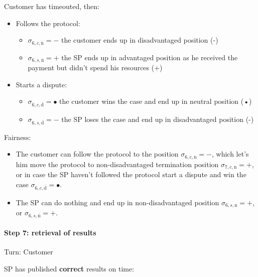 \documentclass{ieeeaccess}
\begin{document}
Customer has timeouted, then:

\begin{itemize}
\item
  Follows the protocol:

  \begin{itemize}
  
  \item
    \(\sigma_{6, c, \overline{\mathrm{n}}} = -\) the customer ends up in
    disadvantaged position (-)
  \item
    \(\sigma_{6, s, \overline{\mathrm{n}}} = +\) the SP ends up in
    advantaged position as he received the payment but didn't spend his
    resources (+)
  \end{itemize}
\item
  Starts a dispute:

  \begin{itemize}
  
  \item
    \(\sigma_{6, c, \overline{\mathrm{d}}} = •\) the customer wins the
    case and end up in neutral position (•)
  \item
    \(\sigma_{6, s, \overline{\mathrm{d}}} = -\) the SP loses the case
    and end up in disadvantaged position (-)
  \end{itemize}
\end{itemize}

Fairness:

\begin{itemize}

\item
  The customer can follow the protocol to the position
  \(\sigma_{6, c, \mathrm{n}} = -\), which let's him move the protocol
  to non-disadvantaged termination position
  \(\sigma_{7, c, \mathrm{n}} = +\), or in case the SP haven't followed
  the protocol start a dispute and win the case
  \(\sigma_{6, c, \overline{\mathrm{d}}} = •\).
\item
  The SP can do nothing and end up in non-disadvantaged position
  \(\sigma_{6, s, \mathrm{n}} = +\), or
  \(\sigma_{6, s, \overline{\mathrm{n}}} = +\).
\end{itemize}

\paragraph{Step 7: retrieval of
results}\label{step-7-retrieval-of-results}

Turn: Customer

SP has published \textbf{correct} results on time:
\end{document}
